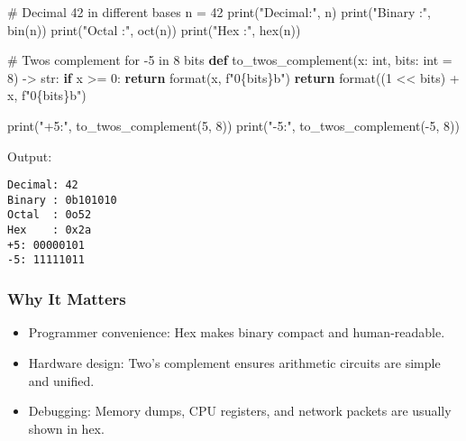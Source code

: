 \documentclass[
  letterpaper,
  DIV=11,
  numbers=noendperiod]{scrreprt}
\newenvironment{Shaded}{\begin{snugshade}}{\end{snugshade}}
\newcommand{\BuiltInTok}[1]{\textcolor[rgb]{0.00,0.23,0.31}{#1}}
\newcommand{\CommentTok}[1]{\textcolor[rgb]{0.37,0.37,0.37}{#1}}
\newcommand{\ControlFlowTok}[1]{\textcolor[rgb]{0.00,0.23,0.31}{\textbf{#1}}}
\newcommand{\DecValTok}[1]{\textcolor[rgb]{0.68,0.00,0.00}{#1}}
\newcommand{\KeywordTok}[1]{\textcolor[rgb]{0.00,0.23,0.31}{\textbf{#1}}}
\newcommand{\NormalTok}[1]{\textcolor[rgb]{0.00,0.23,0.31}{#1}}
\newcommand{\OperatorTok}[1]{\textcolor[rgb]{0.37,0.37,0.37}{#1}}
\newcommand{\SpecialCharTok}[1]{\textcolor[rgb]{0.37,0.37,0.37}{#1}}
\newcommand{\SpecialStringTok}[1]{\textcolor[rgb]{0.13,0.47,0.30}{#1}}
\newcommand{\StringTok}[1]{\textcolor[rgb]{0.13,0.47,0.30}{#1}}
\providecommand{\tightlist}{%
  \setlength{\itemsep}{0pt}\setlength{\parskip}{0pt}}
\begin{document}
\begin{Shaded}
\begin{Highlighting}[]
\CommentTok{\# Decimal 42 in different bases}
\NormalTok{n }\OperatorTok{=} \DecValTok{42}
\BuiltInTok{print}\NormalTok{(}\StringTok{"Decimal:"}\NormalTok{, n)}
\BuiltInTok{print}\NormalTok{(}\StringTok{"Binary :"}\NormalTok{, }\BuiltInTok{bin}\NormalTok{(n))}
\BuiltInTok{print}\NormalTok{(}\StringTok{"Octal  :"}\NormalTok{, }\BuiltInTok{oct}\NormalTok{(n))}
\BuiltInTok{print}\NormalTok{(}\StringTok{"Hex    :"}\NormalTok{, }\BuiltInTok{hex}\NormalTok{(n))}

\CommentTok{\# Two\textquotesingle{}s complement for {-}5 in 8 bits}
\KeywordTok{def}\NormalTok{ to\_twos\_complement(x: }\BuiltInTok{int}\NormalTok{, bits: }\BuiltInTok{int} \OperatorTok{=} \DecValTok{8}\NormalTok{) }\OperatorTok{{-}\textgreater{}} \BuiltInTok{str}\NormalTok{:}
    \ControlFlowTok{if}\NormalTok{ x }\OperatorTok{\textgreater{}=} \DecValTok{0}\NormalTok{:}
        \ControlFlowTok{return} \BuiltInTok{format}\NormalTok{(x, }\SpecialStringTok{f"0}\SpecialCharTok{\{}\NormalTok{bits}\SpecialCharTok{\}}\SpecialStringTok{b"}\NormalTok{)}
    \ControlFlowTok{return} \BuiltInTok{format}\NormalTok{((}\DecValTok{1} \OperatorTok{\textless{}\textless{}}\NormalTok{ bits) }\OperatorTok{+}\NormalTok{ x, }\SpecialStringTok{f"0}\SpecialCharTok{\{}\NormalTok{bits}\SpecialCharTok{\}}\SpecialStringTok{b"}\NormalTok{)}

\BuiltInTok{print}\NormalTok{(}\StringTok{"+5:"}\NormalTok{, to\_twos\_complement(}\DecValTok{5}\NormalTok{, }\DecValTok{8}\NormalTok{))}
\BuiltInTok{print}\NormalTok{(}\StringTok{"{-}5:"}\NormalTok{, to\_twos\_complement(}\OperatorTok{{-}}\DecValTok{5}\NormalTok{, }\DecValTok{8}\NormalTok{))}
\end{Highlighting}
\end{Shaded}

Output:

\begin{verbatim}
Decimal: 42
Binary : 0b101010
Octal  : 0o52
Hex    : 0x2a
+5: 00000101
-5: 11111011
\end{verbatim}

\subsubsection{Why It Matters}\label{why-it-matters-1}

\begin{itemize}
\tightlist
\item
  Programmer convenience: Hex makes binary compact and human-readable.
\item
  Hardware design: Two's complement ensures arithmetic circuits are
  simple and unified.
\item
  Debugging: Memory dumps, CPU registers, and network packets are
  usually shown in hex.
\end{itemize}
\end{document}
